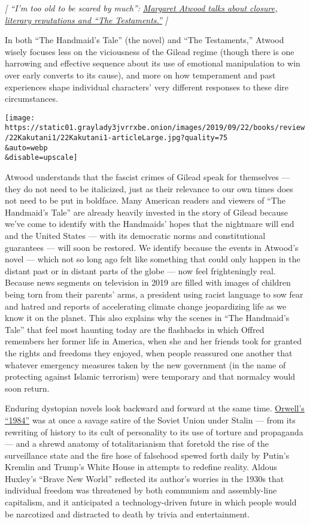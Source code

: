 \emph{{[} ``I'm too old to be scared by much'':}
\href{https://www.nytimes3xbfgragh.onion/2019/09/05/books/handmaids-tale-sequel-testaments-margaret-atwood.html}{\emph{Margaret
Atwood talks about closure, literary reputations and ``The
Testaments.''}} \emph{{]}}

In both ``The Handmaid's Tale'' (the novel) and ``The Testaments,''
Atwood wisely focuses less on the viciousness of the Gilead regime
(though there is one harrowing and effective sequence about its use of
emotional manipulation to win over early converts to its cause), and
more on how temperament and past experiences shape individual
characters' very different responses to these dire circumstances.

\texttt{[image: https://static01.graylady3jvrrxbe.onion/images/2019/09/22/books/review/22Kakutani1/22Kakutani1-articleLarge.jpg?quality=75\\\&auto=webp\\\&disable=upscale]}

Atwood understands that the fascist crimes of Gilead speak for
themselves --- they do not need to be italicized, just as their
relevance to our own times does not need to be put in boldface. Many
American readers and viewers of ``The Handmaid's Tale'' are already
heavily invested in the story of Gilead because we've come to identify
with the Handmaids' hopes that the nightmare will end and the United
States --- with its democratic norms and constitutional guarantees ---
will soon be restored. We identify because the events in Atwood's novel
--- which not so long ago felt like something that could only happen in
the distant past or in distant parts of the globe --- now feel
frighteningly real. Because news segments on television in 2019 are
filled with images of children being torn from their parents' arms, a
president using racist language to sow fear and hatred and reports of
accelerating climate change jeopardizing life as we know it on the
planet. This also explains why the scenes in ``The Handmaid's Tale''
that feel most haunting today are the flashbacks in which Offred
remembers her former life in America, when she and her friends took for
granted the rights and freedoms they enjoyed, when people reassured one
another that whatever emergency measures taken by the new government (in
the name of protecting against Islamic terrorism) were temporary and
that normalcy would soon return.

Enduring dystopian novels look backward and forward at the same time.
\href{https://www.nytimes3xbfgragh.onion/2017/01/26/books/why-1984-is-a-2017-must-read.html}{Orwell's
``1984''} was at once a savage satire of the Soviet Union under Stalin
--- from its rewriting of history to its cult of personality to its use
of torture and propaganda --- and a shrewd anatomy of totalitarianism
that foretold the rise of the surveillance state and the fire hose of
falsehood spewed forth daily by Putin's Kremlin and Trump's White House
in attempts to redefine reality. Aldous Huxley's ``Brave New World''
reflected its author's worries in the 1930s that individual freedom was
threatened by both communism and assembly-line capitalism, and it
anticipated a technology-driven future in which people would be
narcotized and distracted to death by trivia and entertainment.

